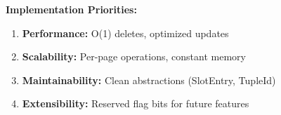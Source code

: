 \documentclass[11pt,a4paper]{article}
\begin{document}
\textbf{Implementation Priorities:}
\begin{enumerate}
    \item \textbf{Performance:} O(1) deletes, optimized updates
    \item \textbf{Scalability:} Per-page operations, constant memory
    \item \textbf{Maintainability:} Clean abstractions (SlotEntry, TupleId)
    \item \textbf{Extensibility:} Reserved flag bits for future features
\end{enumerate}
\end{document}
